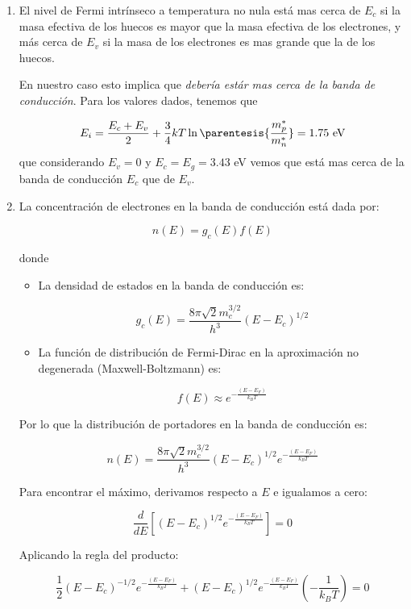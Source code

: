 	\begin{enumerate}[label=\alph*)]
		\item El nivel de Fermi intrínseco a temperatura no nula está mas cerca de $E_c$ si la masa efectiva de los huecos es mayor que la masa efectiva de los electrones, y más cerca de $E_v$ si la masa de los electrones es mas grande que la de los huecos.
		
		En nuestro caso esto implica que \textit{debería estár mas cerca de la banda de conducción}. Para los valores dados, tenemos que

		\begin{equation}
			E_i = \frac{E_c+E_v}{2} + \frac{3}{4} kT \ln\parentesis{\frac{m_p^*}{m_n^*}} = 1.75 \ \text{eV}
		\end{equation}
		que considerando $E_v=0$ y $E_c=E_g=3.43$ eV vemos que está mas cerca de la banda de conducción $E_c$ que de $E_v$.
		\item La concentración de electrones en la banda de conducción está dada por:

		\[
		n(E) = g_c(E) f(E)
		\]

		donde

		\begin{itemize}
			\item La densidad de estados en la banda de conducción es:
		
		  \[
		  g_c(E) = \frac{8\pi \sqrt{2} m_c^{3/2}}{h^3} (E - E_c)^{1/2}
		  \]
		
			\item La función de distribución de Fermi-Dirac en la aproximación no degenerada (Maxwell-Boltzmann) es:
		
		  \[
		  f(E) \approx e^{-\frac{(E - E_F)}{k_B T}}
		  \]
		\end{itemize}
		
		Por lo que la distribución de portadores en la banda de conducción es:
		
		\[
		n(E) = \frac{8\pi \sqrt{2} m_c^{3/2}}{h^3} (E - E_c)^{1/2} e^{-\frac{(E - E_F)}{k_B T}}
		\]
		
		Para encontrar el máximo, derivamos respecto a \( E \) e igualamos a cero:
		
		\[
		\frac{d}{dE} \left[ (E - E_c)^{1/2} e^{-\frac{(E - E_F)}{k_B T}} \right] = 0
		\]
		
		Aplicando la regla del producto:
		
		\[
		\frac{1}{2} (E - E_c)^{-1/2} e^{-\frac{(E - E_F)}{k_B T}} + (E - E_c)^{1/2} e^{-\frac{(E - E_F)}{k_B T}} \left(-\frac{1}{k_B T} \right) = 0
		\]
		

\end{enumerate}
